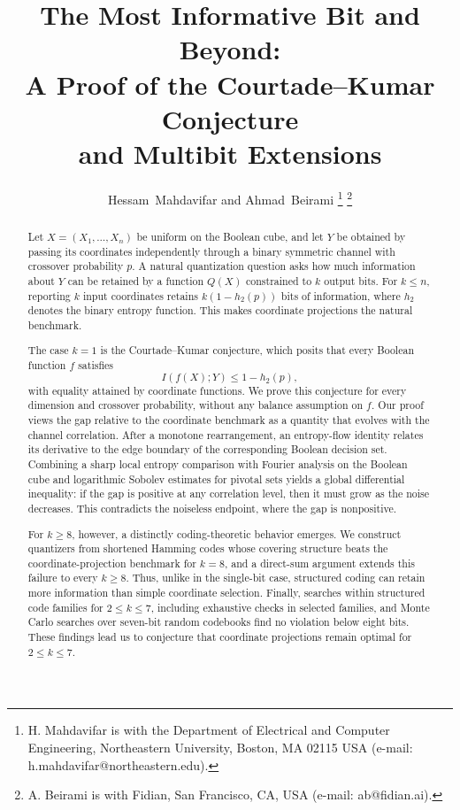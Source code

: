 \documentclass[journal]{IEEEtran}
\theoremstyle{definition}
\theoremstyle{remark}
\begin{document}
\title{The Most Informative Bit and Beyond: \\A Proof of the Courtade--Kumar Conjecture \\and Multibit Extensions}

\author{Hessam~Mahdavifar and Ahmad~Beirami
\thanks{H. Mahdavifar is with the Department of Electrical and Computer
Engineering, Northeastern University, Boston, MA 02115 USA
(e-mail: h.mahdavifar@northeastern.edu).}
\thanks{A. Beirami is with Fidian, San Francisco,
CA, USA (e-mail: ab@fidian.ai).}%
}

\maketitle


\begin{abstract}
Let \(X=(X_1,\ldots,X_n)\) be uniform on the Boolean cube, and let \(Y\)
be obtained by passing its coordinates independently through a binary
symmetric channel with crossover probability \(p\). A natural quantization
question asks how much information about \(Y\) can be retained by a
function \(Q(X)\) constrained to \(k\) output bits. For \(k\leq n\),
reporting \(k\) input coordinates retains \(k(1-h_2(p))\) bits of
information, where \(h_2\) denotes the binary entropy function. This
makes coordinate projections the natural benchmark.

The case \(k=1\) is the Courtade--Kumar conjecture, which posits that every
Boolean function \(f\) satisfies
\[
    I(f(X);Y)\leq 1-h_2(p),
\]
with equality attained by coordinate functions. We prove this conjecture
for every dimension and crossover probability, without any balance
assumption on \(f\). Our proof views the gap relative to the coordinate
benchmark as a quantity that evolves with the channel correlation. After
a monotone rearrangement, an entropy-flow identity relates its derivative
to the edge boundary of the corresponding Boolean decision set. Combining
a sharp local entropy comparison with Fourier analysis on the Boolean cube
and logarithmic Sobolev estimates for pivotal sets yields a global
differential inequality: if the gap is positive at any correlation level,
then it must grow as the noise decreases. This contradicts the noiseless
endpoint, where the gap is nonpositive.

For \(k\geq8\), however, a distinctly coding-theoretic behavior emerges.
We construct quantizers from shortened Hamming codes whose covering
structure beats the coordinate-projection benchmark for \(k=8\), and a
direct-sum argument extends this failure to every \(k\geq8\). Thus, unlike
in the single-bit case, structured coding can retain more information than
simple coordinate selection. Finally, searches within structured code
families for \(2\leq k\leq7\), including exhaustive checks in selected
families, and Monte Carlo searches over seven-bit random codebooks find
no violation below eight bits. These findings lead us to conjecture that
coordinate projections remain optimal for \(2\leq k\leq7\).
\end{abstract}
\end{document}
